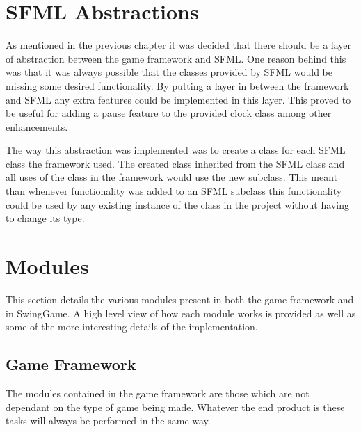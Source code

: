 \documentclass[]{report}
\begin{document}
	\section{SFML Abstractions}
	As mentioned in the previous chapter it was decided that there should be a layer of abstraction between the game framework and SFML. One reason behind this was that it was always possible that the classes provided by SFML would be missing some desired functionality. By putting a layer in between the framework and SFML any extra features could be implemented in this layer. This proved to be useful for adding a pause feature to the provided clock class among other enhancements.
	
	The way this abstraction was implemented was to create a class for each SFML class the framework used. The created class inherited from the SFML class and all uses of the class in the framework would use the new subclass. This meant than whenever functionality was added to an SFML subclass this functionality could be used by any existing instance of the class in the project without having to change its type.
	
	\section{Modules}
	This section details the various modules present in both the game framework and in SwingGame. A high level view of how each module works is provided as well as some of the more interesting details of the implementation.
		\subsection{Game Framework}
		The modules contained in the game framework are those which are not dependant on the type of game being made. Whatever the end product is these tasks will always be performed in the same way.
\end{document}
